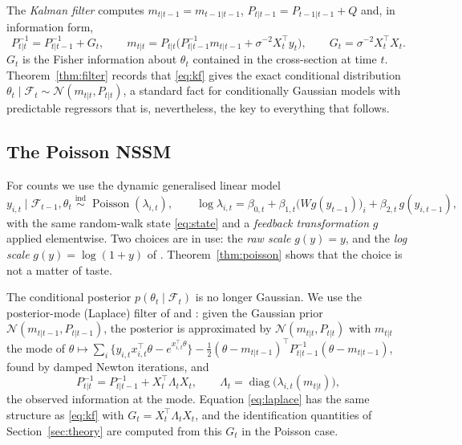 \documentclass[12pt]{article}
\theoremstyle{plain}
\theoremstyle{definition}
\theoremstyle{remark}
\newcommand{\diag}{\operatorname{diag}}
\newcommand{\calF}{\mathcal{F}}
\newcommand{\calN}{\mathcal{N}}
\newcommand{\Pois}{\operatorname{Poisson}}
\newcommand{\T}{^{\top}}
\begin{document}
The \emph{Kalman filter} computes $m_{t|t-1}=m_{t-1|t-1}$, $P_{t|t-1}=P_{t-1|t-1}+Q$ and, in information form,
\begin{equation}\label{eq:kf}
P_{t|t}^{-1}=P_{t|t-1}^{-1}+G_t,\qquad m_{t|t}=P_{t|t}\big(P_{t|t-1}^{-1}m_{t|t-1}+\sigma^{-2}X_t\T y_t\big),\qquad G_t=\sigma^{-2}X_t\T X_t .
\end{equation}
$G_t$ is the Fisher information about $\theta_t$ contained in the cross-section at time $t$. Theorem~\ref{thm:filter} records that \eqref{eq:kf} gives the exact conditional distribution $\theta_t\mid\calF_t\sim\calN(m_{t|t},P_{t|t})$, a standard fact for conditionally Gaussian models with predictable regressors \citep[Chapter~4]{durbin2012time} that is, nevertheless, the key to everything that follows.

\subsection{The Poisson NSSM}
For counts we use the dynamic generalised linear model \citep{west1985dynamic}
\begin{equation}\label{eq:pois}
y_{i,t}\mid\calF_{t-1},\theta_t\;\stackrel{\text{ind}}{\sim}\;\Pois(\lambda_{i,t}),\qquad
\log\lambda_{i,t}=\beta_{0,t}+\beta_{1,t}\big(W g(y_{t-1})\big)_i+\beta_{2,t}\,g(y_{i,t-1}),
\end{equation}
with the same random-walk state \eqref{eq:state} and a \emph{feedback transformation} $g$ applied elementwise. Two choices are in use: the \emph{raw scale} $g(y)=y$, and the \emph{log scale} $g(y)=\log(1+y)$ of \citet{fokianos2011log}. Theorem~\ref{thm:poisson} shows that the choice is not a matter of taste.

The conditional posterior $p(\theta_t\mid\calF_t)$ is no longer Gaussian. We use the posterior-mode (Laplace) filter of \citet{west1985dynamic} and \citet{fahrmeir1992posterior}: given the Gaussian prior $\calN(m_{t|t-1},P_{t|t-1})$, the posterior is approximated by $\calN(m_{t|t},P_{t|t})$ with $m_{t|t}$ the mode of $\theta\mapsto\sum_i\{y_{i,t}x_{i,t}\T\theta-e^{x_{i,t}\T\theta}\}-\frac12(\theta-m_{t|t-1})\T P_{t|t-1}^{-1}(\theta-m_{t|t-1})$, found by damped Newton iterations, and
\begin{equation}\label{eq:laplace}
P_{t|t}^{-1}=P_{t|t-1}^{-1}+X_t\T\Lambda_t X_t,\qquad \Lambda_t=\diag\big(\lambda_{i,t}(m_{t|t})\big),
\end{equation}
the observed information at the mode. Equation \eqref{eq:laplace} has the same structure as \eqref{eq:kf} with $G_t=X_t\T\Lambda_tX_t$, and the identification quantities of Section~\ref{sec:theory} are computed from this $G_t$ in the Poisson case.
\end{document}
